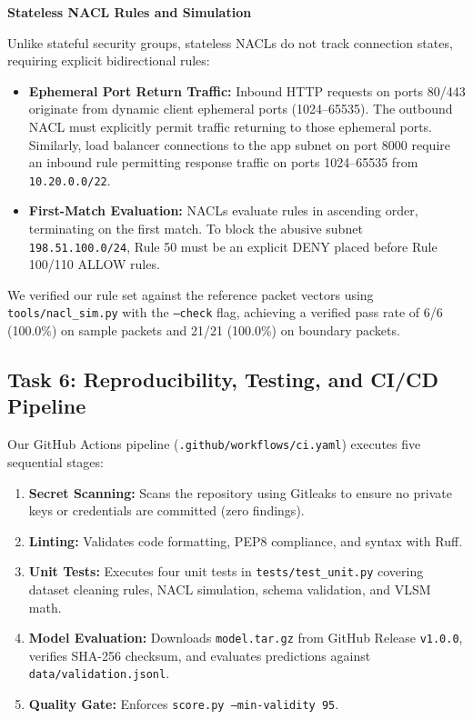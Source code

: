 \documentclass[10pt,a4paper]{article}
\begin{document}
\textbf{Stateless NACL Rules and Simulation}

Unlike stateful security groups, stateless NACLs do not track connection states, requiring explicit bidirectional rules:
\begin{itemize}
    \item \textbf{Ephemeral Port Return Traffic:} Inbound HTTP requests on ports 80/443 originate from dynamic client ephemeral ports (1024--65535). The outbound NACL must explicitly permit traffic returning to those ephemeral ports. Similarly, load balancer connections to the app subnet on port 8000 require an inbound rule permitting response traffic on ports 1024--65535 from \texttt{10.20.0.0/22}.
    \item \textbf{First-Match Evaluation:} NACLs evaluate rules in ascending order, terminating on the first match. To block the abusive subnet \texttt{198.51.100.0/24}, Rule 50 must be an explicit DENY placed before Rule 100/110 ALLOW rules.
\end{itemize}

We verified our rule set against the reference packet vectors using \texttt{tools/nacl\_sim.py} with the \texttt{--check} flag, achieving a verified pass rate of 6/6 (100.0\%) on sample packets and 21/21 (100.0\%) on boundary packets.

\clearpage

\subsection*{Task 6: Reproducibility, Testing, and CI/CD Pipeline}

Our GitHub Actions pipeline (\texttt{.github/workflows/ci.yaml}) executes five sequential stages:
\begin{enumerate}
    \item \textbf{Secret Scanning:} Scans the repository using Gitleaks to ensure no private keys or credentials are committed (zero findings).
    \item \textbf{Linting:} Validates code formatting, PEP8 compliance, and syntax with Ruff.
    \item \textbf{Unit Tests:} Executes four unit tests in \texttt{tests/test\_unit.py} covering dataset cleaning rules, NACL simulation, schema validation, and VLSM math.
    \item \textbf{Model Evaluation:} Downloads \texttt{model.tar.gz} from GitHub Release \texttt{v1.0.0}, verifies SHA-256 checksum, and evaluates predictions against \texttt{data/validation.jsonl}.
    \item \textbf{Quality Gate:} Enforces \texttt{score.py --min-validity 95}.
\end{enumerate}
\end{document}
